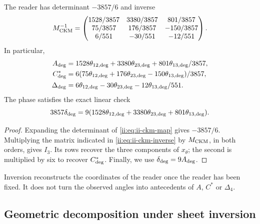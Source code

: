 \begin{proposition}
The reader has determinant \(-3857/6\) and inverse
\begin{equation}
 \mathsf M_{\rm CKM}^{-1}=
 \begin{pmatrix}
 1528/3857&3380/3857&801/3857\\
 75/3857&176/3857&-150/3857\\
 6/551&-30/551&-12/551
 \end{pmatrix}.
 \label{ii:eq:ii-ckm-inverse}
\end{equation}
In particular,
\begin{align}
 A_{\rm deg}
 &=\frac{1528\theta_{12,\rm deg}+3380\theta_{23,\rm deg}
          +801\theta_{13,\rm deg}}{3857},\nonumber\\
 C^*_{\rm deg}
 &=\frac{6(75\theta_{12,\rm deg}+176\theta_{23,\rm deg}
          -150\theta_{13,\rm deg})}{3857},\nonumber\\
 \Delta_{\rm deg}
 &=\frac{6\theta_{12,\rm deg}-30\theta_{23,\rm deg}
          -12\theta_{13,\rm deg}}{551}.
 \label{ii:eq:ii-ckm-recover}
\end{align}
The phase satisfies the exact linear check
\begin{equation}
 3857\delta_{\rm deg}
 =9(1528\theta_{12,\rm deg}+3380\theta_{23,\rm deg}
      +801\theta_{13,\rm deg}).
 \label{ii:eq:ii-ckm-phase-check}
\end{equation}
\end{proposition}

\begin{proof}
Expanding the determinant of \eqref{ii:eq:ii-ckm-map} gives \(-3857/6\). Multiplying the matrix indicated in \eqref{ii:eq:ii-ckm-inverse} by \(\mathsf M_{\rm CKM}\), in both orders, gives \(I_3\). Its rows recover the three components of \(x_\theta\); the second is multiplied by six to recover \(C^*_{\rm deg}\). Finally, we use \(\delta_{\rm deg}=9A_{\rm deg}\).
\end{proof}

Inversion reconstructs the coordinates of the reader once the reader has been fixed. It does not turn the observed angles into antecedents of \(A\), \(C^*\) or \(\Delta_4\).


\subsection{Geometric decomposition under sheet inversion}
\label{ii:sec:ii09-descomposicion-paridad}


